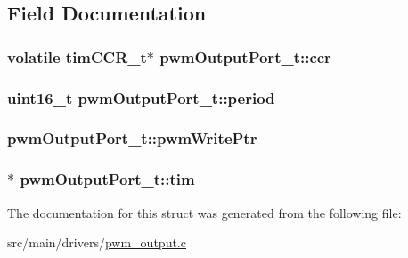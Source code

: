 \subsection{Field Documentation}
\hypertarget{structpwmOutputPort__t_aceca272a692eab6366adf18bc638faa2}{
\subsubsection[{ccr}]{\setlength{\rightskip}{0pt plus 5cm}volatile tim\+C\+C\+R\+\_\+t$\ast$ pwm\+Output\+Port\+\_\+t\+::ccr}}\label{structpwmOutputPort__t_aceca272a692eab6366adf18bc638faa2}
\hypertarget{structpwmOutputPort__t_a17278e53cefe809d10acc1aa369544d3}{
\subsubsection[{period}]{\setlength{\rightskip}{0pt plus 5cm}uint16\+\_\+t pwm\+Output\+Port\+\_\+t\+::period}}\label{structpwmOutputPort__t_a17278e53cefe809d10acc1aa369544d3}
\hypertarget{structpwmOutputPort__t_ae9bd21fdfb297c2898fb959ca84b992d}{
\subsubsection[{pwm\+Write\+Ptr}]{ pwm\+Output\+Port\+\_\+t\+::pwm\+Write\+Ptr}}\label{structpwmOutputPort__t_ae9bd21fdfb297c2898fb959ca84b992d}
\hypertarget{structpwmOutputPort__t_af302ace40a383a0ec8cc3818555af13d}{
\subsubsection[{tim}]{$\ast$ pwm\+Output\+Port\+\_\+t\+::tim}}\label{structpwmOutputPort__t_af302ace40a383a0ec8cc3818555af13d}


The documentation for this struct was generated from the following file\+:\begin{DoxyCompactItemize}
\item 
src/main/drivers/\hyperlink{pwm__output_8c}{pwm\+\_\+output.\+c}\end{DoxyCompactItemize}
